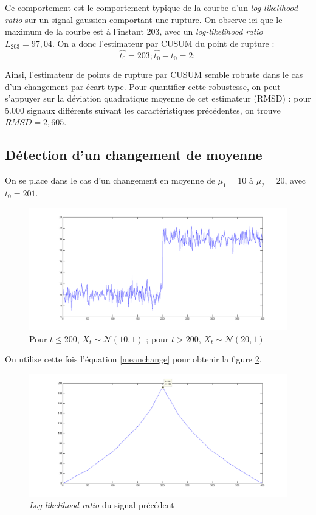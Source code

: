\documentclass[french,12pt,notitlepage]{report}
\begin{document}
	Ce comportement est le comportement typique de la courbe d'un \textit{log-likelihood ratio} sur un signal gaussien comportant une rupture. On observe ici que le maximum de la courbe est à l'instant 203, avec un \textit{log-likelihood ratio} $L_203 = 97,04$. On a donc l'estimateur par CUSUM du point de rupture :
	\begin{equation*}
		\hat{t_0} = 203 ; \hat{t_0} - t_0 = 2;
	\end{equation*}
	
	Ainsi, l'estimateur de points de rupture par CUSUM semble robuste dans le cas d'un changement par écart-type. Pour quantifier cette robustesse, on peut s'appuyer sur la déviation quadratique moyenne de cet estimateur (RMSD) : pour 5.000 signaux différents suivant les caractéristiques précédentes, on trouve $RMSD = 2,605$.
	
	\subsection{Détection d'un changement de moyenne}
	On se place dans le cas d'un changement en moyenne de $\mu_1 = 10$ à $\mu_2 = 20$, avec $t_0 = 201$.
	
	\begin{figure}[h]
		\includegraphics[scale=0.4]{test_signal_mean.png}
		\caption{Pour $t \leq 200$, $X_t \sim \mathcal{N}(10, 1)$ ; pour $t > 200$, $X_t \sim \mathcal{N}(20, 1)$}
		\label{test_signal_mean}
	\end{figure}
	
	On utilise cette fois l'équation \ref{meanchange} pour obtenir la figure \ref{llr_test_mean}.
	
	\begin{figure}[h]
		\includegraphics[scale=0.4]{llr_test_mean.png}
		\caption{\textit{Log-likelihood ratio} du signal précédent}
		\label{llr_test_mean}
	\end{figure}
	
\end{document}
